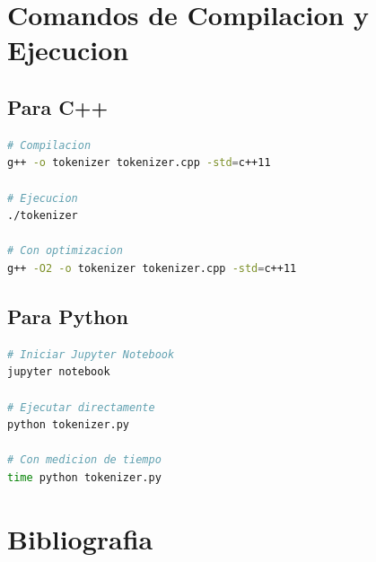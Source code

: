 \documentclass[12pt,a4paper]{article}
\begin{document}
\newpage

\section{Comandos de Compilacion y Ejecucion}

\subsection{Para C++}

\begin{lstlisting}[language=bash, caption=Compilacion y ejecucion del tokenizador en C++]
# Compilacion
g++ -o tokenizer tokenizer.cpp -std=c++11

# Ejecucion
./tokenizer

# Con optimizacion
g++ -O2 -o tokenizer tokenizer.cpp -std=c++11
\end{lstlisting}

\subsection{Para Python}

\begin{lstlisting}[language=bash, caption=Ejecucion de los notebooks de Python]
# Iniciar Jupyter Notebook
jupyter notebook

# Ejecutar directamente
python tokenizer.py

# Con medicion de tiempo
time python tokenizer.py
\end{lstlisting}

\newpage

\section{Bibliografia}
\end{document}
